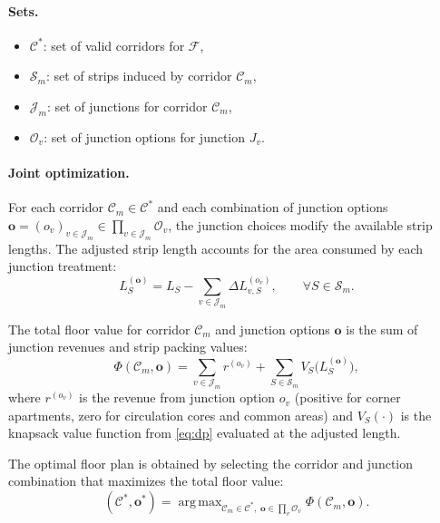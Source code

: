 \documentclass[11pt,a4paper]{article}
\DeclareMathOperator*{\argmax}{arg\,max}
\newcommand{\calF}{\mathcal{F}}
\newcommand{\calS}{\mathcal{S}}
\newcommand{\calC}{\mathcal{C}}
\newcommand{\calJ}{\mathcal{J}}
\newcommand{\calO}{\mathcal{O}}
\begin{document}
\paragraph{Sets.}
\begin{itemize}[nosep]
    \item $\calC^*$: set of valid corridors for $\calF$,
    \item $\calS_m$: set of strips induced by corridor $\calC_m$,
    \item $\calJ_m$: set of junctions for corridor $\calC_m$,
    \item $\calO_v$: set of junction options for junction $J_v$.
\end{itemize}

\paragraph{Joint optimization.}

For each corridor $\calC_m \in \calC^*$ and each combination of junction
options $\mathbf{o} = (o_v)_{v \in \calJ_m} \in \prod_{v \in \calJ_m} \calO_v$,
the junction choices modify the available strip lengths. The adjusted
strip length accounts for the area consumed by each junction treatment:
\begin{equation}
    L_S^{(\mathbf{o})} = L_S - \sum_{v \in \calJ_m} \Delta L_{v,S}^{(o_v)}, \qquad \forall S \in \calS_m.
\end{equation}

The total floor value for corridor $\calC_m$ and junction options
$\mathbf{o}$ is the sum of junction revenues and strip packing values:
\begin{equation}\label{eq:floor-value}
    \Phi(\calC_m, \mathbf{o}) = \sum_{v \in \calJ_m} r^{(o_v)} + \sum_{S \in \calS_m} V_S\!\bigl(L_S^{(\mathbf{o})}\bigr),
\end{equation}
where $r^{(o_v)}$ is the revenue from junction option $o_v$ (positive
for corner apartments, zero for circulation cores and common areas) and
$V_S(\cdot)$ is the knapsack value function from \eqref{eq:dp} evaluated
at the adjusted length.

The optimal floor plan is obtained by selecting the corridor and junction
combination that maximizes the total floor value:
\begin{equation}\label{eq:floor-opt}
    (\calC^*, \mathbf{o}^*) = \argmax_{\calC_m \in \calC^*,\; \mathbf{o} \in \prod_{v} \calO_v} \Phi(\calC_m, \mathbf{o}).
\end{equation}
\end{document}
